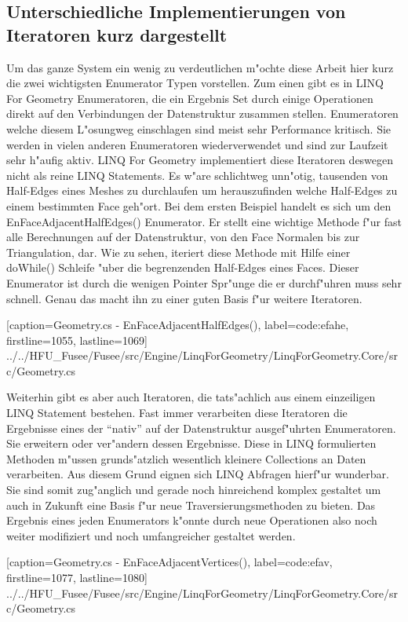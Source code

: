 \documentclass[pagesize, paper=a4, fontsize=12pt,titlepage=true, headings=small, headnosepline, abstractoff, liststotoc, nochapterprefix, plainheadsepline]{scrreprt}
\newcommand{\LFGS}{LINQ For Geometry }
\begin{document}
		\subsection {Unterschiedliche Implementierungen von Iteratoren kurz dargestellt}
			Um das ganze System ein wenig zu verdeutlichen m"ochte diese Arbeit hier kurz die zwei wichtigsten Enumerator Typen vorstellen. Zum einen gibt es in \LFGS Enumeratoren, die ein Ergebnis Set durch einige Operationen direkt auf den Verbindungen der Datenstruktur zusammen stellen. Enumeratoren welche diesem L"osungweg einschlagen sind meist sehr Performance kritisch. Sie werden in vielen anderen Enumeratoren wiederverwendet und sind zur Laufzeit sehr h"aufig aktiv. \LFGS implementiert diese Iteratoren deswegen nicht als reine LINQ Statements. Es w"are schlichtweg unn"otig, tausenden von Half-Edges eines Meshes zu durchlaufen um herauszufinden welche Half-Edges zu einem bestimmten Face geh"ort. Bei dem ersten Beispiel handelt es sich um den EnFaceAdjacentHalfEdges() Enumerator. Er stellt eine wichtige Methode f"ur fast alle Berechnungen auf der Datenstruktur, von den Face Normalen bis zur Triangulation, dar. Wie zu sehen, iteriert diese Methode mit Hilfe einer do{}While() Schleife "uber die begrenzenden Half-Edges eines Faces. Dieser Enumerator ist durch die wenigen Pointer Spr"unge die er durchf"uhren muss sehr schnell. Genau das macht ihn zu einer guten Basis f"ur weitere Iteratoren.


			[caption={Geometry.cs - EnFaceAdjacentHalfEdges()}, label=code:efahe, firstline=1055, lastline=1069]
			{../../HFU_Fusee/Fusee/src/Engine/LinqForGeometry/LinqForGeometry.Core/src/Geometry.cs}

Weiterhin gibt es aber auch Iteratoren, die tats"achlich aus einem einzeiligen LINQ Statement bestehen. Fast immer verarbeiten diese Iteratoren die Ergebnisse eines der "`nativ"' auf der Datenstruktur ausgef"uhrten Enumeratoren. Sie erweitern oder ver"andern dessen Ergebnisse. Diese in LINQ formulierten Methoden m"ussen grunds"atzlich wesentlich kleinere Collections an Daten verarbeiten. Aus diesem Grund eignen sich LINQ Abfragen hierf"ur wunderbar. Sie sind somit zug"anglich und gerade noch hinreichend komplex gestaltet um auch in Zukunft eine Basis f"ur neue Traversierungsmethoden zu bieten.
Das Ergebnis eines jeden Enumerators k"onnte durch neue Operationen also noch weiter modifiziert und noch umfangreicher gestaltet werden.

			[caption={Geometry.cs - EnFaceAdjacentVertices()}, label=code:efav, firstline=1077, lastline=1080]
			{../../HFU_Fusee/Fusee/src/Engine/LinqForGeometry/LinqForGeometry.Core/src/Geometry.cs}
\end{document}
